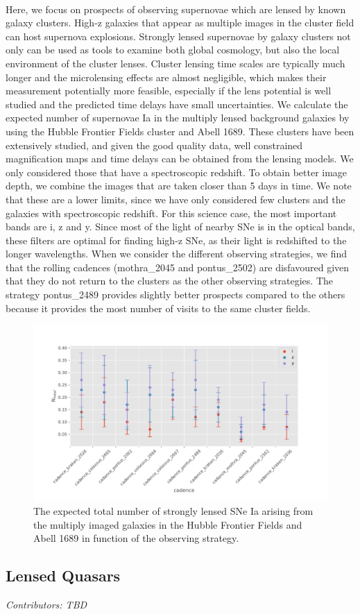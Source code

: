 \

Here, we focus on prospects of observing supernovae which are
lensed by known galaxy clusters. High-z galaxies that appear as
multiple images in the cluster field can host supernova
explosions. Strongly lensed supernovae by galaxy clusters not only
can be used as tools to examine both global cosmology, but also
the local environment of the cluster lenses. Cluster lensing time
scales are typically much longer and the microlensing effects are
almost negligible, which makes their measurement potentially more
feasible, especially if the lens potential is well studied and the
predicted time delays have small uncertainties. We calculate the
expected number of supernovae Ia in the multiply lensed background
galaxies by using the Hubble Frontier Fields cluster and Abell
1689. These clusters have been extensively studied, and given the
good quality data, well constrained magnification maps and time
delays can be obtained from the lensing models. We only considered
those that have a spectroscopic redshift. To obtain better image
depth, we combine the images that are taken closer than 5 days in
time. We note that these are a lower limits, since we have only
considered few clusters and the galaxies with spectroscopic
redshift. For this science case, the most important bands are i, z
and y. Since most of the light of nearby SNe is in the optical
bands, these filters are optimal for finding high-z SNe, as their
light is redshifted to the longer wavelengths. When we consider
the different observing strategies, we find that the rolling
cadences (mothra\_2045 and pontus\_2502) are disfavoured given that
they do not return to the clusters as the other observing
strategies. The strategy pontus\_2489 provides slightly better
prospects compared to the others because it provides the most
number of visits to the same cluster fields.

\begin{figure}
\centering
\includegraphics[scale=0.65]{figures/sl_galaxy_lensing.pdf}\caption{The expected total number of strongly lensed SNe Ia arising from the multiply imaged galaxies in the Hubble Frontier Fields and Abell 1689 in function of the observing strategy. }
\end{figure}


\subsection{Lensed Quasars}
\textit{Contributors: TBD}
